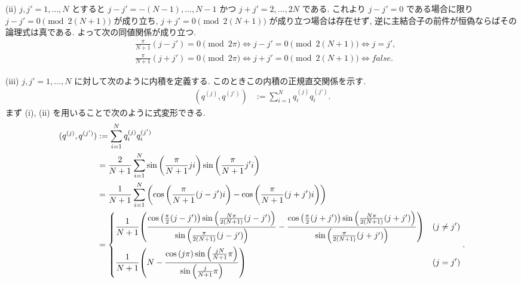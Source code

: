 \documentclass[uplatex,dvipdfmx,a4paper,11pt]{jlreq}
\theoremstyle{definition}
\begin{document}
(ii) $j, j' = 1,\ldots,N$ とすると $j - j' = -(N - 1),\ldots,N - 1$ かつ $j + j' = 2,\ldots,2N$ である. これより $j - j' = 0$ である場合に限り $j - j' = 0 \pmod{2(N+1)}$ が成り立ち, $j + j' = 0 \pmod{2(N+1)}$ が成り立つ場合は存在せず, 逆に主結合子の前件が恒偽ならばその論理式は真である. よって次の同値関係が成り立つ.
\begin{align}
   & \frac{\pi}{N+1}(j - j') = 0 \pmod{2\pi} \iff j - j' = 0 \pmod{2(N+1)} \iff j = j', \label{Q17-3. ii-1} \\
   & \frac{\pi}{N+1}(j + j') = 0 \pmod{2\pi} \iff j + j' = 0 \pmod{2(N+1)} \iff false. \label{Q17-3. ii-2}
\end{align}

(iii) $j, j' = 1,\ldots,N$ に対して次のように内積を定義する. このときこの内積の正規直交関係を示す.
\begin{align}
  (q^{(j)}, q^{(j')}) & := \sum_{i = 1}^{N}q_i^{(j)}q_i^{(j')}.
\end{align}
まず (i), (ii) を用いることで次のように式変形できる.
\begin{align}
  (q^{(j)}, q^{(j')}) & := \sum_{i = 1}^{N}q_i^{(j)}q_i^{(j')}                                                                                                                                                                                                                                                 \\
                      & = \frac{2}{N+1}\sum_{i = 1}^{N}\sin\qty(\frac{\pi}{N+1}ji)\sin\qty(\frac{\pi}{N+1}j'i)                                                                                                                                                                                                 \\
                      & = \frac{1}{N+1}\sum_{i = 1}^{N}\qty(\cos\qty(\frac{\pi}{N+1}(j - j')i) - \cos\qty(\frac{\pi}{N+1}(j + j')i))                                                                                                                                                                           \\
                      & = \begin{dcases}
                            \frac{1}{N+1}\qty(\frac{\cos\qty(\frac{\pi}{2}(j - j'))\sin\qty(\frac{N\pi}{2(N+1)}(j - j'))}{\sin\qty(\frac{\pi}{2(N+1)}(j - j'))} - \frac{\cos\qty(\frac{\pi}{2}(j + j'))\sin\qty(\frac{N\pi}{2(N+1)}(j + j'))}{\sin\qty(\frac{\pi}{2(N+1)}(j + j'))}) & (j \neq j') \\
                            \frac{1}{N+1}\qty(N - \frac{\cos\qty(j\pi)\sin\qty(\frac{jN}{N+1}\pi)}{\sin\qty(\frac{j}{N+1}\pi)})                                                                                                                                                      & (j = j')
                          \end{dcases}.
\end{align}
\end{document}
